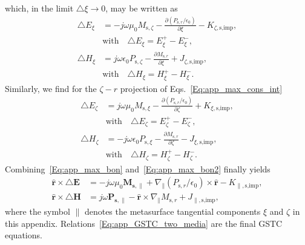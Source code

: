 \documentclass[journal,transaction]{IEEEtran}
\newcommand{\ve}[1]{\mathbf{#1}}
\newcommand{\uve}[1]{\mathbf{\hat{#1}}}
\begin{document}
%
which, in the limit $\triangle\xi\rightarrow 0$, may be written as
%
\begin{subequations}\label{Eq:app_max_bon}
\begin{align}
\triangle E_\xi&=-j\omega\mu_0 M_{\text{s},\zeta}-\frac{\partial (P_{\text{s},r}/\epsilon_0)}{\partial \xi}-K_{\zeta,\text{s,imp}},\\
&\text{with}\quad\triangle E_\xi=E_\xi^+-E_\xi^-,\\
\triangle H_\xi&=j\omega\epsilon_0P_{\text{s},\zeta}-\frac{\partial M_{\text{s},r}}{\partial \xi}+J_{\zeta,\text{s,imp}},\\
&\text{with}\quad\triangle H_\xi=H_\xi^+-H_\xi^-.
\end{align}
\end{subequations}
%
Similarly, we find for the $\zeta-r$ projection of Eqs.~\eqref{Eq:app_max_cons_int}
%
\begin{subequations}\label{Eq:app_max_bon2}
\begin{align}
\triangle E_\zeta&=j\omega\mu_0 M_{\text{s},\xi}-\frac{\partial (P_{\text{s},r}/\epsilon_0)}{\partial \zeta}+K_{\xi,\text{s,imp}},\\
&\text{with}\quad\triangle E_\zeta=E_\zeta^+-E_\zeta^-,\\\triangle H_\zeta&=-j\omega\epsilon_0P_{\text{s},\xi}-\frac{\partial M_{\text{s},r}}{\partial \zeta}-J_{\xi,\text{s,imp}},\\
&\text{with}\quad\triangle H_\zeta=H_\zeta^+-H_\zeta^-.
\end{align}
\end{subequations}
%
Combining~\eqref{Eq:app_max_bon} and~\eqref{Eq:app_max_bon2} finally yields
%
\begin{subequations}\label{Eq:app_GSTC_two_media}
\begin{align}
\uve{r}\times\triangle\ve{E}&=-j\omega\mu_0\ve{M_{\text{s},\|}}+\nabla_{\|}(P_{\text{s},r}/\epsilon_0)\times\uve{r}-K_{\|,\text{s,imp}},\\
\uve{r}\times\triangle\ve{H}&=j\omega\ve{P_{\text{s},\|}}-\uve{r}\times\nabla_{\|}M_{\text{s},r}+J_{\|,\text{s,imp}},
\end{align}
\end{subequations}
%
where the symbol $\|$ denotes the metasurface tangential components $\xi$ and $\zeta$ in this appendix. Relations~\eqref{Eq:app_GSTC_two_media} are the final GSTC equations.
\end{document}
